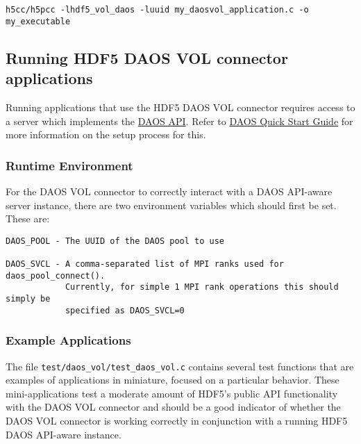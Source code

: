 \begin{verbatim}
h5cc/h5pcc -lhdf5_vol_daos -luuid my_daosvol_application.c -o my_executable
\end{verbatim}

\newpage

\subsection{Running HDF5 DAOS VOL connector applications}

Running applications that use the HDF5 DAOS VOL connector requires access to a server which implements the \href{https://github.com/daos-stack/daos/blob/master/src/include/daos_api.h}{DAOS API}. Refer to \href{https://github.com/daos-stack/daos/blob/master/doc/quickstart.md}{DAOS Quick Start Guide} for more information on the setup process for this.


\subsubsection{Runtime Environment}
\label{sec:runtime_env}

For the DAOS VOL connector to correctly interact with a DAOS API-aware server instance, there are two environment variables which should first be set. These are:

\begin{verbatim}
DAOS_POOL - The UUID of the DAOS pool to use

DAOS_SVCL - A comma-separated list of MPI ranks used for daos_pool_connect().
            Currently, for simple 1 MPI rank operations this should simply be
            specified as DAOS_SVCL=0
\end{verbatim}

\subsubsection{Example Applications}

The file \texttt{test/daos\_vol/test\_daos\_vol.c} contains several test functions that are examples of applications in miniature, focused on a particular behavior. These mini-applications test a moderate amount of HDF5's public API functionality with the DAOS VOL connector and should be a good indicator of whether the DAOS VOL connector is working correctly in conjunction with a running HDF5 DAOS API-aware instance.

